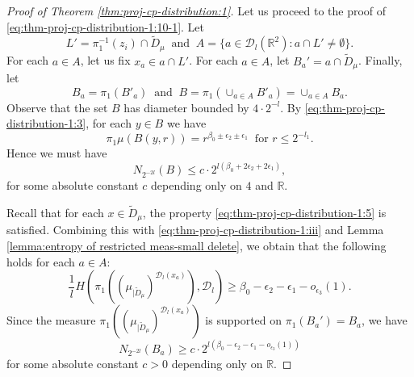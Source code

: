 \documentclass[a4paper,11pt]{amsart}
\theoremstyle{definition}
\numberwithin{equation}{section}
\def\D{\mathcal{D}}
\def\R{\mathbb R}
\begin{document}
\begin{proof}[Proof of Theorem \ref{thm:proj-cp-distribution:1}]
Let us proceed to the proof of \eqref{eq:thm-proj-cp-distribution-1:10-1}. Let 
\[L'=\pi_1^{-1}(z_i)\cap \tilde{D}_\mu\ \textrm{ and } \ A=\{a\in \D_l(\R^2): a\cap L'\neq \emptyset\}.\]
For each $a\in A$, let us fix $x_a\in a\cap L'$.   For each $a\in A$, let $B_a'=a\cap \tilde{D}_\mu$.  Finally, let 
\[B_a=\pi_1 (B'_a) \ \textrm{ and } \  B=\pi_1(\cup_{a\in A}B'_a)=\cup_{a\in A}B_a.\]
Observe that the set $B$ has diameter bounded by $4\cdot 2^{-l}$.  By  \eqref{eq:thm-proj-cp-distribution-1:3},  for each $y\in B$ we have
\[
\pi_1\mu(B(y,  r)) = r^{\beta_0\pm\epsilon_2\pm\epsilon_1} \  \textrm{ for } r\le 2^{-l_1}.
\]
Hence we must have 
\begin{equation}\label{eq:thm-proj-cp-distribution-1:11}
N_{2^{-2l}}(B) \le  c \cdot  2^{l(\beta_0+2\epsilon_2+2 \epsilon_1)},
\end{equation}
for some absolute constant $c$ depending only on $4$ and $\R$.  

Recall that for each $x\in \tilde{D}_\mu$,  the property \eqref{eq:thm-proj-cp-distribution-1:5} is satisfied.  Combining this with  \eqref{eq:thm-proj-cp-distribution-1:iii} and Lemma \ref{lemma:entropy of restricted meas-small delete},  we obtain that the following holds for each $a\in A$:
\[
\frac{1}{l}H\left(\pi_1\left(\left(\mu_{|\tilde{D}_\mu}\right)^{\D_l(x_a)}\right),  \D_l\right)\ge \beta_0-\epsilon_2- \epsilon_1-o_{\epsilon_3}(1). 
\]
Since the measure $\pi_1\left(\left(\mu_{|\tilde{D}_\mu}\right)^{\D_l(x_a)}\right)$ is supported on $\pi_1(B_a')=B_a$, we have
\begin{equation}\label{eq:thm-proj-cp-distribution-1:12}
N_{2^{-2l}}(B_a) \ge   c \cdot  2^{l(\beta_0-\epsilon_2- \epsilon_1-o_{\epsilon_3}(1))}
\end{equation}
for some absolute constant $c>0$ depending only on $\R$.


\end{proof}
\end{document}
